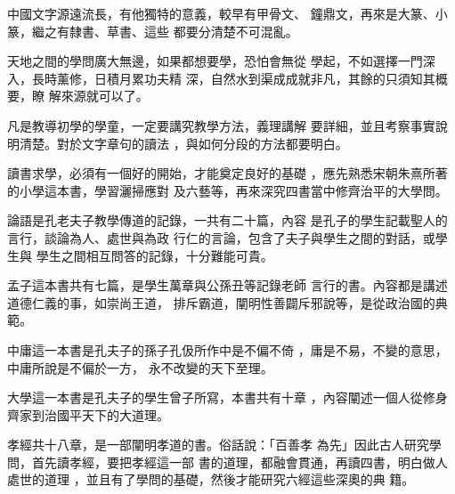 \documentclass[avery5371,grid]{flashcards}
\begin{document}
{中國文字源遠流長，有他獨特的意義，較早有甲骨文、
鐘鼎文，再來是大篆、小篆，繼之有隸書、草書、這些
都要分清楚不可混亂。} %
{} %

{天地之間的學問廣大無邊，如果都想要學，恐怕會無從
學起，不如選擇一門深入，長時薰修，日積月累功夫精
深，自然水到渠成成就非凡，其餘的只須知其概要，瞭
解來源就可以了。} %
{} %

{凡是教導初學的學童，一定要講究教學方法，義理講解
要詳細，並且考察事實說明清楚。對於文字章句的讀法
，與如何分段的方法都要明白。} %
{} %

{讀書求學，必須有一個好的開始，才能奠定良好的基礎
，應先熟悉宋朝朱熹所著的小學這本書，學習灑掃應對
及六藝等，再來深究四書當中修齊治平的大學問。} %
{} %

{論語是孔老夫子教學傳道的記錄，一共有二十篇，內容
是孔子的學生記載聖人的言行，談論為人、處世與為政
行仁的言論，包含了夫子與學生之間的對話，或學生與
學生之間相互問答的記錄，十分難能可貴。} %
{} %


{孟子這本書共有七篇，是學生萬章與公孫丑等記錄老師
言行的書。內容都是講述道德仁義的事，如崇尚王道，
排斥霸道，闡明性善闢斥邪說等，是從政治國的典範。} %
{} %

{中庸這一本書是孔夫子的孫子孔伋所作中是不偏不倚
，庸是不易，不變的意思，中庸所說是不偏於一方，
永不改變的天下至理。} %
{} %

{大學這一本書是孔夫子的學生曾子所寫，本書共有十章
，內容闡述一個人從修身齊家到治國平天下的大道理。} %
{} %

{孝經共十八章，是一部闡明孝道的書。俗話說：「百善孝
為先」因此古人研究學問，首先讀孝經，要把孝經這一部
書的道理，都融會貫通，再讀四書，明白做人處世的道理
，並且有了學問的基礎，然後才能研究六經這些深奧的典
籍。} %
{} %
\end{document}
